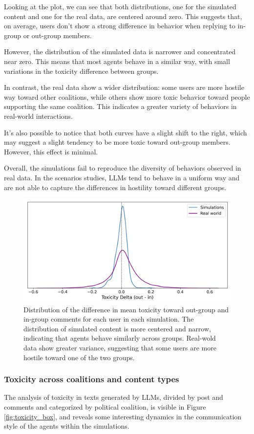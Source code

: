Looking at the plot, we can see that both distributions, one for the simulated content and one for the real data, are centered around zero.
This suggests that, on average, users don't show a strong difference in behavior when replying to in-group or out-group members.

However, the distribution of the simulated data is narrower and concentrated near zero.
This means that most agents behave in a similar way, with small variations in the toxicity difference between groups.

In contrast, the real data show a wider distribution: some users are more hostile way toward other coalitions, while others show more toxic behavior toward people supporting the same coalition.
This indicates a greater variety of behaviors in real-world interactions.

It's also possible to notice that both curves have a slight shift to the right, which may suggest a slight tendency to be more toxic toward out-group members. However, this effect is minimal.

Overall, the simulations fail to reproduce the diversity of behaviors observed in real data. 
In the scenarios studies, LLMs tend to behave in a uniform way and are not able to capture the differences in hostility toward different groups.


\begin{figure}[h]
    \centering
    \includegraphics[width=0.6\linewidth]{Images/Toxicity/diff_in_out_combined.png}
    \caption{
    Distribution of the difference in mean toxicity toward out-group and in-group comments for each user in each simulation.
    The distribution of simulated content is more centered and narrow, indicating that agents behave similarly across groups.
    Real-wold data show greater variance, suggesting that some users are more hostile toward one of the two groups.
    }
    \label{fig:toxicity_in_out}
\end{figure}


\subsubsection{Toxicity across coalitions and content types}
The analysis of toxicity in texts generated by LLMs, divided by post and comments and categorized by political coalition, is visible in Figure \ref{fig:toxicity_box}, and reveals some interesting dynamics in the communication style of the agents within the simulations.

